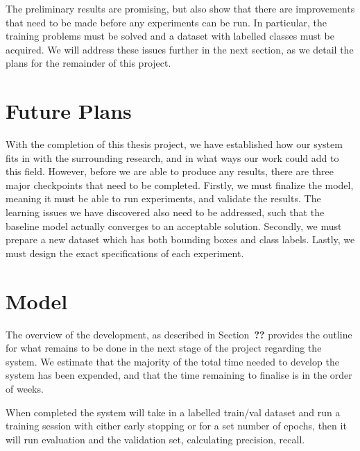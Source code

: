 The preliminary results are promising, but also show that there are improvements that need to be made before any experiments can be run.
In particular, the training problems must be solved and a dataset with labelled classes must be acquired.
We will address these issues further in the next section, as we detail the plans for the remainder of this project.

\section*{Future Plans}

With the completion of this thesis project, we have established how our system fits in with the surrounding research, and in what ways our work could add to this field.
However, before we are able to produce any results, there are three major checkpoints that need to be completed.
Firstly, we must finalize the model, meaning it must be able to run experiments, and validate the results.
The learning issues we have discovered also need to be addressed, such that the baseline model actually converges to an acceptable solution.
Secondly, we must prepare a new dataset which has both bounding boxes and class labels.
Lastly, we must design the exact specifications of each experiment.


\section*{Model}
The overview of the development, as described in Section~\textbf{??} provides the outline for what remains to be done in the next stage of the project regarding the system.
We estimate that the majority of the total time needed to develop the system has been expended, and that the time remaining to finalise is in the order of weeks.

When completed the system will take in a labelled train/val dataset and run a training session with either early stopping or for a set number of epochs, then it will run evaluation and the validation set, calculating precision, recall.

